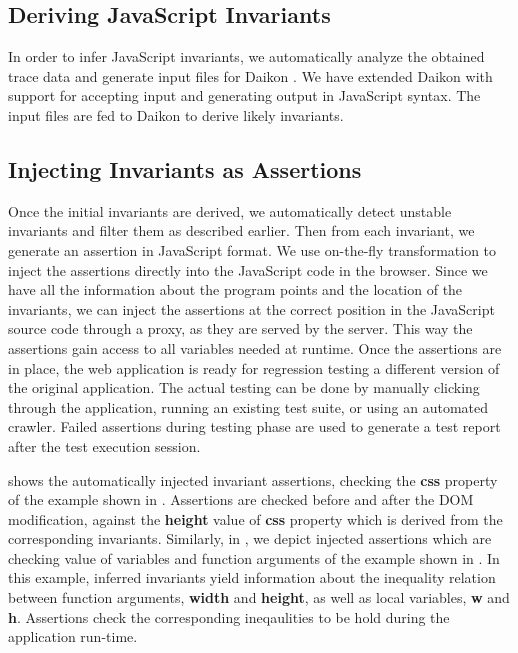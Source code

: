 \subsection{Deriving JavaScript Invariants}
In order to infer JavaScript invariants, we automatically analyze the obtained trace data and generate 
input files for Daikon \cite{?}. We have extended Daikon with support for accepting input and generating 
output in JavaScript syntax. The input files are fed to Daikon to derive likely invariants.

\subsection{Injecting Invariants as Assertions}
Once the initial invariants are derived, we automatically detect unstable invariants and filter them as described earlier. Then
from each invariant, we generate an assertion in JavaScript format. We use on-the-fly transformation to inject the assertions 
directly into the JavaScript code in the browser. Since we have all the information about the program points and the location 
of the invariants, we can inject the assertions at the correct position in the JavaScript source code through a proxy, as 
they are served by the server. This way the assertions gain access to all variables needed at runtime.
Once the assertions are in place, the web application is ready for regression testing a different version of the original application. 
The actual testing can be done by manually clicking through the application, running an existing test suite, or using an automated crawler.
Failed assertions during testing phase are used to generate a test report after the test execution session.

 shows the automatically injected invariant assertions, checking the {\bf css} property of the example shown in
. Assertions are checked before and after the DOM modification, against the {\bf height} value of {\bf css} property which
is derived from the corresponding invariants. Similarly, in , we depict injected assertions which are checking 
value of variables and function arguments of the example shown in . In this example, inferred invariants yield information
about the inequality relation between function arguments, {\bf width} and {\bf height}, as well as local variables, {\bf w} and {\bf h}. Assertions check 
the corresponding ineqaulities to be hold during the application run-time.  
